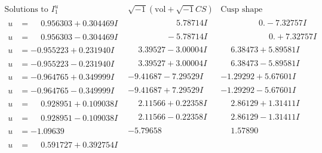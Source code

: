 \documentclass[1p]{elsarticle_modified}
\theoremstyle{definition}
\newcommand{\I}{\sqrt{-1}}
\begin{document}
$$\begin{array}{c|c|c}  
\text{Solutions to }I^u_{1}& \I (\text{vol} + \sqrt{-1}CS) & \text{Cusp shape}\\
 \hline 
\begin{aligned}
u &= \phantom{-}0.956303 + 0.304469 I\end{aligned}
 & \phantom{-0.000000 -}5.78714 I & \phantom{-0.000000 } 0. - 7.32757 I \\ \hline\begin{aligned}
u &= \phantom{-}0.956303 - 0.304469 I\end{aligned}
 & \phantom{-0.000000 } -5.78714 I & \phantom{-0.000000 -}0. + 7.32757 I \\ \hline\begin{aligned}
u &= -0.955223 + 0.231940 I\end{aligned}
 & \phantom{-}3.39527 - 3.00004 I & \phantom{-}6.38473 + 5.89581 I \\ \hline\begin{aligned}
u &= -0.955223 - 0.231940 I\end{aligned}
 & \phantom{-}3.39527 + 3.00004 I & \phantom{-}6.38473 - 5.89581 I \\ \hline\begin{aligned}
u &= -0.964765 + 0.349999 I\end{aligned}
 & -9.41687 - 7.29529 I & -1.29292 + 5.67601 I \\ \hline\begin{aligned}
u &= -0.964765 - 0.349999 I\end{aligned}
 & -9.41687 + 7.29529 I & -1.29292 - 5.67601 I \\ \hline\begin{aligned}
u &= \phantom{-}0.928951 + 0.109038 I\end{aligned}
 & \phantom{-}2.11566 + 0.22358 I & \phantom{-}2.86129 + 1.31411 I \\ \hline\begin{aligned}
u &= \phantom{-}0.928951 - 0.109038 I\end{aligned}
 & \phantom{-}2.11566 - 0.22358 I & \phantom{-}2.86129 - 1.31411 I \\ \hline\begin{aligned}
u &= -1.09639\phantom{ +0.000000I}\end{aligned}
 & -5.79658\phantom{ +0.000000I} & \phantom{-}1.57890\phantom{ +0.000000I} \\ \hline\begin{aligned}
u &= \phantom{-}0.591727 + 0.392754 I\end{aligned}

\end{array}$$
\end{document}
